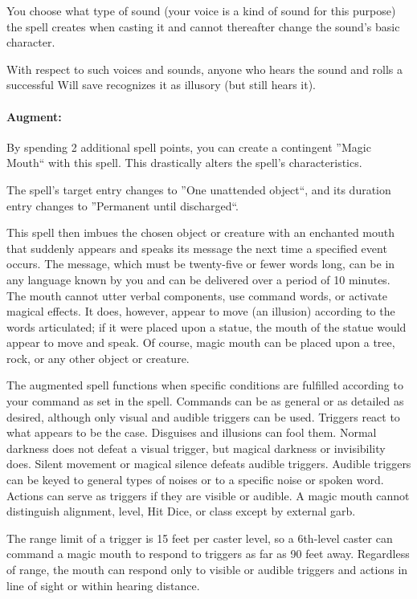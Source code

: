 You choose what type of sound (your voice is a kind of sound for this purpose) 
the spell creates when casting it and cannot thereafter change the sound's basic character.

With respect to such voices and sounds, anyone who hears the sound and rolls a successful Will save recognizes it as illusory (but still hears it).

\paragraph{Augment:} By spending 2 additional spell points, you can create a contingent ''Magic Mouth`` with this spell. 
This drastically alters the spell's characteristics.

The spell's target entry changes to ''One unattended object``, and its duration entry changes to ''Permanent until discharged``.

This spell then imbues the chosen object or creature with an enchanted mouth that suddenly appears and speaks its message the next time a specified event occurs. 
The message, which must be twenty-five or fewer words long, can be in any language known by you and can be delivered over a period of 10 minutes. 
The mouth cannot utter verbal components, use command words, or activate magical effects. 
It does, however, appear to move (an illusion) according to the words articulated; 
if it were placed upon a statue, the mouth of the statue would appear to move and speak.
Of course, magic mouth can be placed upon a tree, rock, or any other object or creature.

The augmented spell functions when specific conditions are fulfilled according to your command as set in the spell. 
Commands can be as general or as detailed as desired, although only visual and audible triggers can be used. 
Triggers react to what appears to be the case. 
Disguises and illusions can fool them. 
Normal darkness does not defeat a visual trigger, but magical darkness or invisibility does. 
Silent movement or magical silence defeats audible triggers. 
Audible triggers can be keyed to general types of noises or to a specific noise or spoken word. 
Actions can serve as triggers if they are visible or audible. 
A magic mouth cannot distinguish alignment, level, Hit Dice, or class except by external garb.

The range limit of a trigger is 15 feet per caster level, so a 6th-level caster can command a magic mouth to respond to triggers as far as 90 feet away. 
Regardless of range, the mouth can respond only to visible or audible triggers and actions in line of sight or within hearing distance.

